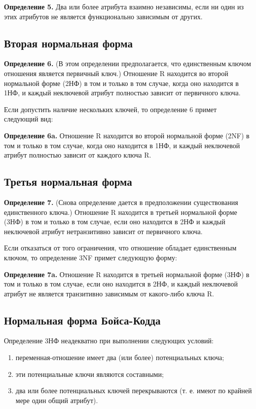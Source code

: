 \textbf{Определение 5.} Два или более атрибута взаимно независимы, если ни один из этих атрибутов не является функционально зависимым от других.

\subsection*{Вторая нормальная форма}

\textbf{Определение 6.} (В этом определении предполагается, что единственным ключом отношения является первичный ключ.) Отношение R находится во второй нормальной форме (2НФ) в том и только в том случае, когда оно находится в 1НФ, и каждый неключевой атрибут полностью зависит от первичного ключа.

Если допустить наличие нескольких ключей, то определение 6 примет следующий вид: 

\textbf{Определение 6a.} Отношение R находится во второй нормальной форме (2NF) в том и только в том случае, когда оно находится в 1НФ, и каждый неключевой атрибут полностью зависит от каждого ключа R.

\subsection*{Третья нормальная форма}

\textbf{Определение 7.} (Снова определение дается в предположении существования единственного ключа.) Отношение R находится в третьей нормальной форме (3НФ) в том и только в том случае, если оно находится в 2НФ и каждый неключевой атрибут нетранзитивно зависит от первичного ключа.

Если отказаться от того ограничения, что отношение обладает единственным ключом, то определение 3NF примет следующую форму: 

\textbf{Определение 7a.} Отношение R находится в третьей нормальной форме (3НФ) в том и только в том случае, если оно находится в 2НФ, и каждый неключевой атрибут не является транзитивно зависимым от какого-либо ключа R.

\subsection*{Нормальная форма Бойса-Кодда}

Определение 3НФ неадекватно при выполнении следующих условий:

\begin{enumerate}[label={\arabic*)}]
	\item  переменная-отношение имеет два (или более) потенциальных ключа;
	\item  эти потенциальные ключи являются составными;
	\item  два или более потенциальных ключей перекрываются (т. е. имеют по крайней мере один общий атрибут).
\end{enumerate}

